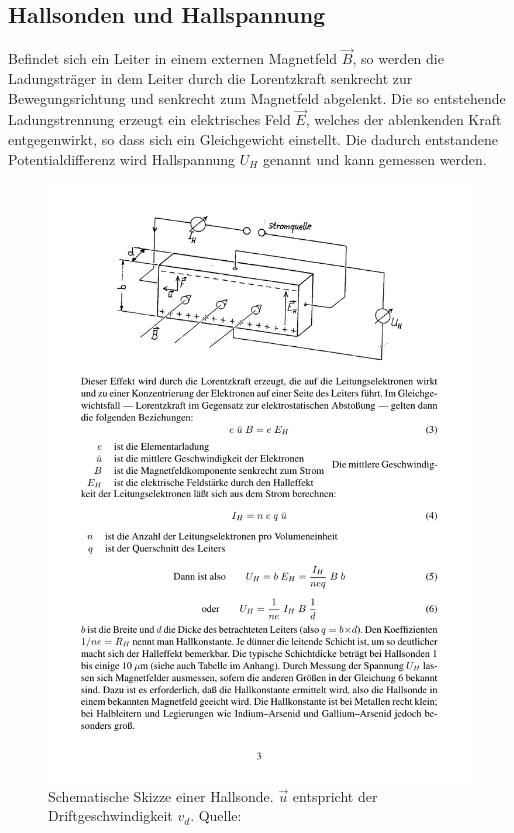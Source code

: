 \documentclass[12pt,a4paper]{article}
\begin{document}
\subsection{Hallsonden und Hallspannung}
\label{ch:hall}
Befindet sich ein Leiter in einem externen Magnetfeld $\vec{B}$, so werden die Ladungsträger in dem Leiter durch die Lorentzkraft senkrecht zur Bewegungsrichtung und senkrecht zum Magnetfeld abgelenkt. Die so entstehende Ladungstrennung erzeugt ein elektrisches Feld $\vec{E}$, welches der ablenkenden Kraft entgegenwirkt, so dass sich ein Gleichgewicht einstellt. Die dadurch entstandene Potentialdifferenz wird Hallspannung $U_H$ genannt und kann gemessen werden.\\
\begin{figure}
	\centering
	\includegraphics[scale=1]{E2.pdf}
	\caption{Schematische Skizze einer Hallsonde. $\vec{u}$ entspricht der Driftgeschwindigkeit $v_d$. Quelle: \cite{kind}}
	\label{e2}
\end{figure}
\end{document}
